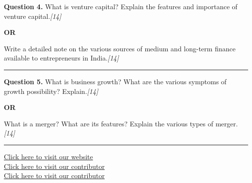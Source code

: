\documentclass[11pt,a4paper]{article}
\newcommand{\pts}[1]{\hfill   \textit{[#1]}}
\begin{document}
\noindent   \textbf{Question 4.}
What is venture capital? Explain the features and importance of venture capital.\pts{14}

\centerline{   \textbf{OR}}

Write a detailed note on the various sources of medium and long-term finance available to entrepreneurs in India.\pts{14}

\medskip\rule{\linewidth}{0.2pt}




\noindent   \textbf{Question 5.}
What is business growth? What are the various symptoms of growth possibility? Explain.\pts{14}

\centerline{   \textbf{OR}}

What is a merger? What are its features? Explain the various types of merger.\pts{14}

\vfill
\rule{\linewidth}{0.4pt}

\begin{center}\small
\href{https://bhu-exam.vercel.app/}{Click here to visit our website}\\[4pt]
\href{https://me-aryan.vercel.app/}{Click here to visit our contributor}\\[4pt]
\href{https://quashan-me.vercel.app/}{Click here to visit our contributor}
\end{center}
\end{document}
